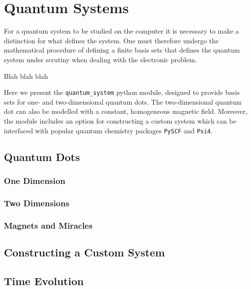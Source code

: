 \chapter{Quantum Systems}

For a quantum system to be studied on the computer it is necessary to 
make a distinction for what defines the system. One must therefore undergo the
mathematical procedure of defining a finite basis sets that defines the 
quantum system under scrutiny when dealing with the electronic problem. 

Blah blah blah

Here we present the \lstinline{quantum_system} python module, designed to 
provide basis sets for one- and two-dimensional quantum dots. The two-dimensional 
quantum dot can also be modelled with a constant, homogeneous magnetic field. 
Moreover, the module includes an option for constructing a custom system which can 
be interfaced with popular quantum chemistry packages \lstinline{PySCF} and 
\lstinline{Psi4}\cite{PYSCF, parrish2017psi4}.

\section{Quantum Dots}

\subsection{One Dimension}

\subsection{Two Dimensions}

\subsection{Magnets and Miracles}

\section{Constructing a Custom System}

\section{Time Evolution}

